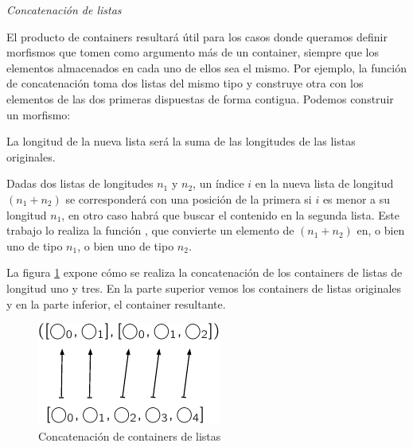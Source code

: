 \begin{example}{\it Concatenación de listas}\label{example:append}

  El producto de containers resultará útil para los casos donde queramos definir morfismos que tomen como argumento más de un container, siempre que los elementos almacenados en cada uno de ellos sea el mismo. Por ejemplo, la función de concatenación toma dos listas del mismo tipo y construye otra con los elementos de las dos primeras dispuestas de forma contigua. Podemos construir un morfismo:


  La longitud de la nueva lista será la suma de las longitudes de las listas originales. 


  Dadas dos listas de longitudes $n_1$ y $n_2$, un índice $i$ en la nueva lista de longitud $(n_1 + n_2)$ se corresponderá con una posición de la primera si $i$ es menor a su longitud $n_1$, en otro caso habrá que buscar el contenido en la segunda lista. Este trabajo lo realiza la función , que convierte un elemento de  $(n_1 + n_2)$ en, o bien uno de tipo  $n_1$, o bien uno de tipo  $n_2$.


  La figura \ref{fig:append} expone cómo se realiza la concatenación de los containers de listas de longitud uno y tres. En la parte superior vemos los containers de listas originales y en la parte inferior, el container resultante. 

\begin{figure}[H]
    \begin{center}
  \includegraphics{img/append.pdf}
    \end{center}
    \label{fig:append}
    \caption{Concatenación de containers de listas}
\end{figure}


\end{example}
